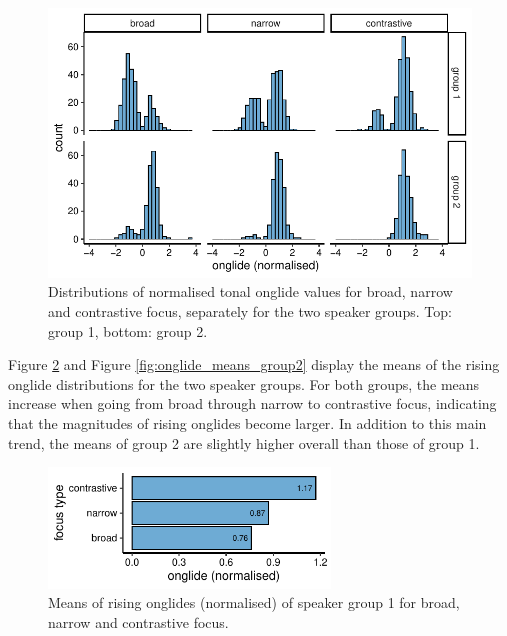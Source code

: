 \begin{figure}[htbp]
\begin{center}
\includegraphics[width=\textwidth]{figures/ch6/onglide_norm_distribution_within_groups.pdf}
\caption[Distributions of normalised tonal onglide values for broad, narrow and contrastive focus, separately for the two speaker groups.]{Distributions of normalised tonal onglide values for broad, narrow and contrastive focus, separately for the two speaker groups. Top: group 1, bottom: group 2.}
\label{fig:onglide_distributions_groups}
\end{center}
\end{figure}

Figure \ref{fig:onglide_means_group1} and Figure \ref{fig:onglide_means_group2} display the means of the rising onglide distributions for the two speaker groups. For both groups, the means increase when going from broad through narrow to contrastive focus, indicating that the magnitudes of rising onglides become larger. In addition to this main trend, the means of group 2 are slightly higher overall than those of group 1.

\begin{figure}[htbp]
\begin{center}
\includegraphics[width=7.5cm]{figures/ch6/onglide_norm_rising_means_group1.pdf}
\caption{Means of rising onglides (normalised) of speaker group 1 for broad, narrow and contrastive focus.}
\label{fig:onglide_means_group1}
\end{center}
\end{figure}

